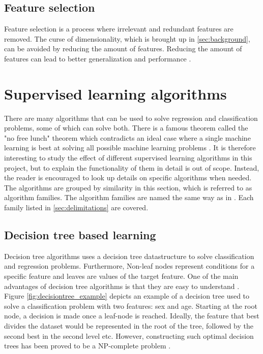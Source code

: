 	\subsection{Feature selection} \label{sec:feature_selection}
		Feature selection is a process where irrelevant and redundant features are removed. The curse of dimensionality, which is brought up in \ref{sec:background}, can be avoided by reducing the amount of features. Reducing the amount of features can lead to better generalization and performance \cite{ARTICLE:10, ARTICLE:22}. 
	


	
\section{Supervised learning algorithms} \label{sec:supervised_algorithms}
	There are many algorithms that can be used to solve regression and classification problems, some of which can solve both. There is a famous theorem called the "no free lunch" theorem which contradicts an ideal case where a single machine learning is best at solving all possible machine learning problems \cite{ARTICLE:5}.  It is therefore interesting to study the effect of different supervised learning algorithms in this project, but to explain the functionality of them in detail is out of scope. Instead, the reader is encouraged to look up details on specific algorithms when needed. The algorithms are grouped by similarity in this section, which is referred to as algorithm families. The algorithm families are named the same way as in \cite{BOOK:6}. Each family listed in \ref{sec:delimitations} are covered. 

	\subsection{Decision tree based learning}
		Decision tree algorithms uses a decision tree datastructure to solve classification and regression problems. Furthermore, Non-leaf nodes represent conditions for a specific feature and leaves are values of the target feature. One of the main advantages of decision tree algorithms is that they are easy to understand \cite{ARTICLE:7}. Figure \ref{fig:decisiontree_example} depicts an example of a decision tree used to solve a classification problem with two features: sex and age. Starting at the root node, a decision is made once a leaf-node is reached. Ideally, the feature that best divides the dataset would be represented in the root of the tree, followed by the second best in the second level etc. However, constructing such optimal decision trees has been proved to be a NP-complete problem \cite{ARTICLE:11}. 

